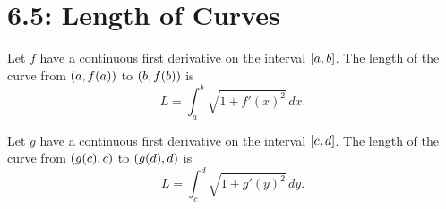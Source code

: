 \documentclass[../mathNotesPreamble]{subfiles}
\begin{document}
  \section{6.5: Length of Curves}

  \begin{defn*}[Arc Length for $y=f(x)$]
    Let $f$ have a continuous first derivative on the interval ${\left[a,b\right]}$. The length of the curve from ${\left(a, f(a)\right)}$ to ${\left(b, f(b)\right)}$ is
      \[L=\int_a^b \sqrt{1+f'(x)^2}\,dx.\]
  \end{defn*}

  \begin{defn*}[Arc Length for $x=g(y)$]
    Let $g$ have a continuous first derivative on the interval ${\left[c,d\right]}$. The length of the curve from ${\left(g(c),c\right)}$ to ${\left(g(d),d\right)}$ is
      \[L=\int_c^d \sqrt{1+g'(y)^2}\,dy.\]
  \end{defn*}

  
\end{document}
